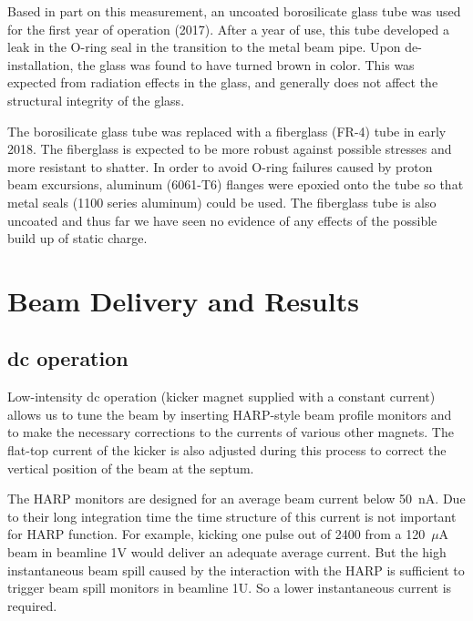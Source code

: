 \documentclass[aps,prab,twocolumn,superscriptaddress]{revtex4-1}
\begin{document}
Based in part on this measurement, an uncoated borosilicate glass tube was used for the first year of operation (2017).  After a year of use, this tube developed a leak in the O-ring seal in the transition to the metal beam pipe. Upon de-installation, the glass was found to have turned brown in color. This was expected from radiation effects in the glass, and generally does not affect the structural integrity of the glass.

The borosilicate glass tube was replaced with a fiberglass (FR-4) tube in early 2018. The fiberglass is expected to be more robust against possible stresses and more resistant to shatter.  In order to avoid O-ring failures caused by proton beam excursions, aluminum (6061-T6) flanges were epoxied onto the tube so that metal seals (1100 series aluminum) could be used. The fiberglass tube is also uncoated and thus far we have seen no evidence of any effects of the possible build up of static charge.



\section{Beam Delivery and Results}
\subsection{dc operation}
\label{sec:DC}

Low-intensity dc operation (kicker magnet supplied with a constant current) allows us to tune the beam by inserting HARP-style beam profile monitors and to make the necessary corrections to the currents of various other magnets.
The flat-top current of the kicker is also adjusted during this process to correct the vertical position of the beam at the septum.

The HARP monitors are designed for an average beam current below 50~nA. Due to their long integration time the time structure of this current is not important for HARP function. For example, kicking one pulse out of 2400 from a 120~$\mu$A beam in beamline 1V would deliver an adequate average current.
But the high instantaneous beam spill caused by the interaction with the HARP is sufficient to trigger beam spill monitors in beamline 1U.  So a lower instantaneous current is required.
\end{document}
